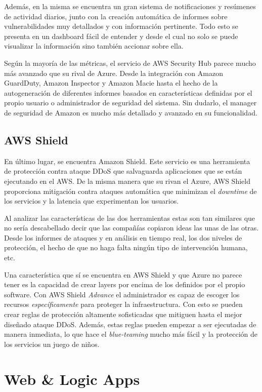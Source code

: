 \documentclass[english,runningheads,a4paper]{llncs}[2018/03/10]
\begin{document}
Además, en la misma se encuentra un gran sistema de notificaciones y resúmenes
de actividad diarios, junto con la creación automática de informes sobre
vulnerabilidades muy detallados y con información pertinente. Todo esto se
presenta en un dashboard fácil de entender y desde el cual no solo se puede
visualizar la información sino también accionar sobre ella. 

Según la mayoría de las métricas, el servicio de AWS Security Hub parece mucho
más avanzado que su rival de Azure. Desde la integración con Amazon GuardDuty,
Amazon Inspector y Amazon Macie hasta el hecho de la autogeneración de
diferentes informes basados en características definidas por el propio usuario o
administrador de seguridad del sistema. Sin dudarlo, el manager de seguridad de
Amazon es mucho más detallado y avanzado en su funcionalidad.

\subsection*{AWS Shield}
En último lugar, se encuentra Amazon Shield. Este servicio es una herramienta de
protección contra ataque DDoS que salvaguarda aplicaciones que se están
ejecutando en el AWS. De la misma manera que su rivan el Azure, AWS Shield
proporciona mitigación contra ataques automática que minimizan el
\textit{downtime} de los servicios y la latencia que experimentan los usuarios. 

Al analizar las características de las dos herramientas estas son tan similares
que no sería descabellado decir que las compañías copiaron ideas las unas de las
otras. Desde los informes de ataques y en análisis en tiempo real, los dos
niveles de protección, el hecho de que no haga falta ningún tipo de intervención
humana, etc.

Una característica que sí se encuentra en AWS Shield y que Azure no parece tener
es la capacidad de crear layers por encima de los definidos por el propio
software. Con AWS Shield \textit{Advance} el administrador es capaz de escoger
los recursos \textit{específicamente} para proteger la infraestructura. Con esto
se pueden crear reglas de protección altamente sofisticadas que mitiguen hasta
el mejor diseñado ataque DDoS. Además, estas reglas pueden empezar a ser
ejecutadas de manera inmediata, lo que hace el \textit{blue-teaming} mucho más
fácil y la protección de los servicios un juego de niños.

\section{Web \& Logic Apps}
\end{document}
